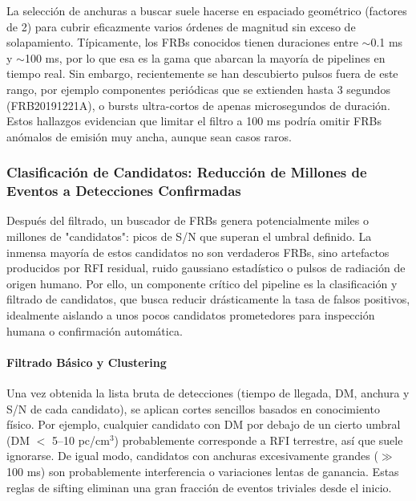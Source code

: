 La selección de anchuras a buscar suele hacerse en espaciado geométrico (factores de 2) para cubrir eficazmente varios órdenes de magnitud sin exceso de solapamiento. Típicamente, los FRBs conocidos tienen duraciones entre $\sim$0.1 ms y $\sim$100 ms, por lo que esa es la gama que abarcan la mayoría de pipelines en tiempo real. Sin embargo, recientemente se han descubierto pulsos fuera de este rango, por ejemplo componentes periódicas que se extienden hasta 3 segundos (FRB20191221A), o bursts ultra-cortos de apenas microsegundos de duración. Estos hallazgos evidencian que limitar el filtro a 100 ms podría omitir FRBs anómalos de emisión muy ancha, aunque sean casos raros.

\subsubsection{Clasificación de Candidatos: Reducción de Millones de Eventos a Detecciones Confirmadas}

Después del filtrado, un buscador de FRBs genera potencialmente miles o millones de "candidatos": picos de S/N que superan el umbral definido. La inmensa mayoría de estos candidatos no son verdaderos FRBs, sino artefactos producidos por RFI residual, ruido gaussiano estadístico o pulsos de radiación de origen humano. Por ello, un componente crítico del pipeline es la clasificación y filtrado de candidatos, que busca reducir drásticamente la tasa de falsos positivos, idealmente aislando a unos pocos candidatos prometedores para inspección humana o confirmación automática.

\paragraph{Filtrado Básico y Clustering}

Una vez obtenida la lista bruta de detecciones (tiempo de llegada, DM, anchura y S/N de cada candidato), se aplican cortes sencillos basados en conocimiento físico. Por ejemplo, cualquier candidato con DM por debajo de un cierto umbral (DM $<$ 5--10 pc/cm$^3$) probablemente corresponde a RFI terrestre, así que suele ignorarse. De igual modo, candidatos con anchuras excesivamente grandes ($\gg$100 ms) son probablemente interferencia o variaciones lentas de ganancia. Estas reglas de sifting eliminan una gran fracción de eventos triviales desde el inicio.

